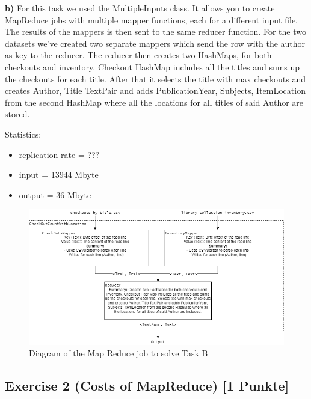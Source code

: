 \documentclass[]{article}
\providecommand{\tightlist}{%
  \setlength{\itemsep}{0pt}\setlength{\parskip}{0pt}}
\begin{document}
\textbf{b)} For this task we used the MultipleInputs class. It allows
you to create MapReduce jobs with multiple mapper functions, each for a
different input file. The results of the mappers is then sent to the
same reducer function. For the two datasets we've created two separate
mappers which send the row with the author as key to the reducer. The
reducer then creates two HashMaps, for both checkouts and inventory.
Checkout HashMap includes all the titles and sums up the checkouts for
each title. After that it selects the title with max checkouts and
creates Author, Title TextPair and adds PublicationYear, Subjects,
ItemLocation from the second HashMap where all the locations for all
titles of said Author are stored.

Statistics:

\begin{itemize}
\tightlist
\item
  replication rate = ???
\item
  input = 13944 Mbyte
\item
  output = 36 Mbyte
\end{itemize}

\begin{figure}[h]

{\centering \includegraphics[width=450px]{images/Exercise_1_Task_B} 

}

\caption{\label{fig:figs}Diagram of the Map Reduce job to solve Task B}\label{fig:unnamed-chunk-2}
\end{figure}

\newpage

\hypertarget{exercise-2-costs-of-mapreduce-1-punkte}{%
\subsection{Exercise 2 (Costs of MapReduce) {[}1
Punkte{]}}\label{exercise-2-costs-of-mapreduce-1-punkte}}
\end{document}
